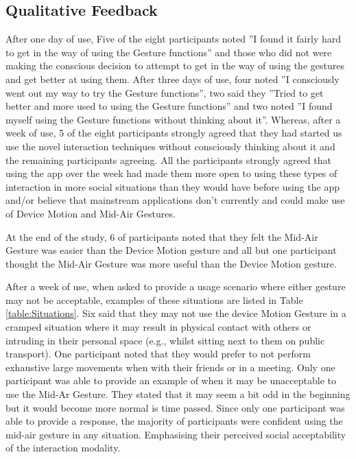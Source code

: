 \documentclass{l4proj}
\begin{document}
\subsection{Qualitative Feedback}

After one day of use, Five of the eight participants noted ''I found it fairly hard to get in the way of using the Gesture functions'' and those who did not were making the conscious decision to attempt to get in the way of using the gestures and get better at using them. After three days of use, four noted ''I consciously went out my way to try the Gesture functions'', two said they ''Tried to get better and more used to using the Gesture functions'' and two noted ''I found myself using the Gesture functions without thinking about it''. Whereas, after a week of use, 5 of the eight participants strongly agreed that they had started us use the novel interaction techniques without consciously thinking about it and the remaining participants agreeing. All the participants strongly agreed that using the app over the week had made them more open to using these types of interaction in more social situations than they would have before using the app and/or believe that mainstream applications don't currently and could make use of Device Motion and Mid-Air Gestures.

At the end of the study, 6 of participants noted that they felt the Mid-Air Gesture was easier than the Device Motion gesture and all but one participant thought the Mid-Air Gesture was more useful than the Device Motion gesture.

After a week of use, when asked to provide a usage scenario where either gesture may not be acceptable, examples of these situations are listed in Table \ref{table:Situations}. Six said that they may not use the device Motion Gesture in a cramped situation where it may result in physical contact with others or intruding in their personal space (e.g., whilst sitting next to them on public transport). One participant noted that they would prefer to not perform exhaustive large movements when with their friends or in a meeting. Only one participant was able to provide an example of when it may be unacceptable to use the Mid-Ar Gesture. They stated that it may seem a bit odd in the beginning but it would become more normal is time passed. Since only one participant was able to provide a response, the majority of participants were confident using the mid-air gesture in any situation. Emphasising their perceived social acceptability of the interaction modality.
\end{document}
